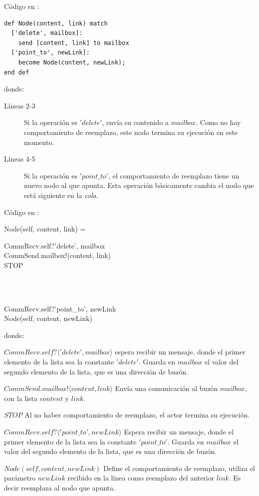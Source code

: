 Código en \SAL:

\begin{lstlisting}[language=sal, style=simple]
def Node(content, link) match
  ['delete', mailbox]:
    send [content, link] to mailbox
  ['point_to', newLink]:
    become Node(content, newLink);
end def
\end{lstlisting}
donde:
\begin{description}
 \item [Líneas 2-3] Si la operación es $'delete'$, envía su contenido a $mailbox$. Como no hay comportamiento de reemplazo, este nodo termina su ejecución en este momento.
 \item [Líneas 4-5] Si la operación es $'point\_to'$, el comportamiento de reemplazo tiene un nuevo nodo al que apunta. Esta operación básicamente cambia el nodo que está siguiente en la \textit{cola}.
\end{description}

Código en \CSP:

\begin{process}
Node(self, content, link) = \\ \quad
  \begin{block}
  CommRecv.self?\langle 'delete', mailbox \rangle \then \\
  CommSend.mailbox!(content, link) \then \\
  STOP
  \end{block} \\

  \Extchoice \\ \quad
  
  \begin{block}
  CommRecv.self?\langle 'point\_to', newLink\rangle \then \\
  Node(self, content, newLink)
  \end{block}
\end{process}
donde: 
\begin{description}
 \item $CommRecv.self?\langle 'delete', mailbox \rangle$ espera recibir un mensaje, donde el primer elemento de la lista sea la constante $'delete'$. Guarda en $mailbox$ el valor del segundo elemento de la lista, que es una dirección de buzón.
 \item $CommSend.mailbox!\langle content, link \rangle$ Envía una comunicación al buzón $mailbox$, con la lista $content$ y $link$.
 \item $STOP$ Al no haber comportamiento de reemplazo, el actor termina su ejecución.
 \item $CommRecv.self?\langle 'point\_to', newLink \rangle$ Espera recibir un mensaje, donde el primer elemento de la lista sea la constante $'point\_to'$. Guarda en $mailbox$ el valor del segundo elemento de la lista, que es una dirección de buzón.
 \item $Node(self, content, newLink)$ Define el comportamiento de reemplazo, utiliza el parámetro $newLink$ recibido en la línea como reemplazo del anterior $link$. Es decir reemplaza al nodo que apunta.
\end{description}


